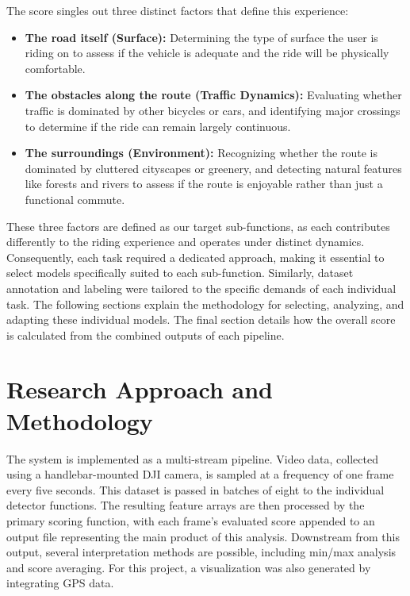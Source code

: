 \documentclass[letterpaper,journal]{IEEEtran}
\begin{document}
The score singles out three distinct factors that define this
experience:
\begin{itemize}
  \item \textbf{The road itself (Surface):} Determining the type of
    surface the user is riding on to assess if the vehicle is adequate
    and the ride will be physically comfortable.
  \item \textbf{The obstacles along the route (Traffic Dynamics):}
    Evaluating whether traffic is dominated by other bicycles or cars,
    and identifying major crossings to determine if the ride can
    remain largely continuous.
  \item \textbf{The surroundings (Environment):} Recognizing whether
    the route is dominated by cluttered cityscapes or greenery, and
    detecting natural features like forests and rivers to assess if
    the route is enjoyable rather than just a functional commute.
\end{itemize}

These three factors are defined as our target sub-functions, 
as each contributes differently to the riding experience and operates under distinct dynamics. 
Consequently, each task required a dedicated approach, 
making it essential to select models specifically suited to each sub-function. 
Similarly, dataset annotation and labeling were tailored to the specific demands of each individual task.
The following sections explain the methodology for selecting, analyzing, and adapting these individual models. 
The final section details how the overall score is calculated from the combined outputs of each pipeline.

\section{Research Approach and Methodology}

The system is implemented as a multi-stream pipeline. Video data, collected
using a handlebar-mounted DJI camera, is sampled at a frequency of one frame
every five seconds. This dataset is passed in batches of eight to the
individual detector functions. The resulting feature arrays are then
processed by the primary scoring function, with each frame's evaluated score
appended to an output file representing the main product of this analysis.
Downstream from this output, several interpretation methods are possible,
including min/max analysis and score averaging. For this project, a
visualization was also generated by integrating GPS data.
\end{document}

